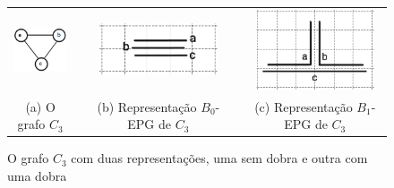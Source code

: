 \begin{figure}[h]
  \centering
  \begin{tabular}{ c p{0.15cm} c p{0.15cm} c }
    \includegraphics[width=2.3cm]{./img/trianguloabc.png} && \includegraphics[width=3.5cm]{./img/b0epgTransparenciaGrade2.png} & &
    \includegraphics[width=3.5cm]{./img/b1EpgTransparenteGrade2.png}
    \\
    \footnotesize %
    (a) O grafo $C_3$ && \footnotesize(b) Representação $B_0$-EPG de $C_3$ && \footnotesize (c) Representação $B_1$-EPG de $C_3$\\

  \end{tabular}

 \caption{O grafo $ C_3 $ com duas representações, uma sem dobra e outra com uma dobra} \label{fig:trianguloepgRepresentacao}
\end{figure}